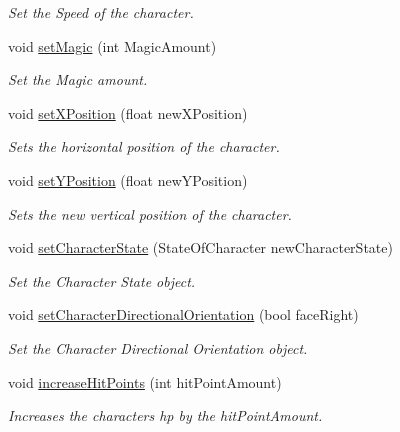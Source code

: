 \begin{DoxyCompactItemize}
\begin{DoxyCompactList}\small\item\em Set the Speed of the character. \end{DoxyCompactList}\item 
void \mbox{\hyperlink{classCharacterStats_a196481abbfd88753d5e6a55662ea086f}{set\+Magic}} (int Magic\+Amount)
\begin{DoxyCompactList}\small\item\em Set the Magic amount. \end{DoxyCompactList}\item 
void \mbox{\hyperlink{classCharacterStats_a46c3cc5fce4e17bccb2a3b690f3ac7aa}{set\+X\+Position}} (float new\+X\+Position)
\begin{DoxyCompactList}\small\item\em Sets the horizontal position of the character. \end{DoxyCompactList}\item 
void \mbox{\hyperlink{classCharacterStats_ab1ff93a3f5a89c57092b52ee6df40061}{set\+Y\+Position}} (float new\+Y\+Position)
\begin{DoxyCompactList}\small\item\em Sets the new vertical position of the character. \end{DoxyCompactList}\item 
void \mbox{\hyperlink{classCharacterStats_ae6624dc6f06e58e635296ad5336cdd70}{set\+Character\+State}} (State\+Of\+Character new\+Character\+State)
\begin{DoxyCompactList}\small\item\em Set the Character State object. \end{DoxyCompactList}\item 
void \mbox{\hyperlink{classCharacterStats_ab5382a7eab127aeb603de23d51877099}{set\+Character\+Directional\+Orientation}} (bool face\+Right)
\begin{DoxyCompactList}\small\item\em Set the Character Directional Orientation object. \end{DoxyCompactList}\item 
void \mbox{\hyperlink{classCharacterStats_a82b3b7fe66687a1210a8ea4c28d86738}{increase\+Hit\+Points}} (int hit\+Point\+Amount)
\begin{DoxyCompactList}\small\item\em Increases the characters hp by the hit\+Point\+Amount. \end{DoxyCompactList}\item 

\end{DoxyCompactItemize}
